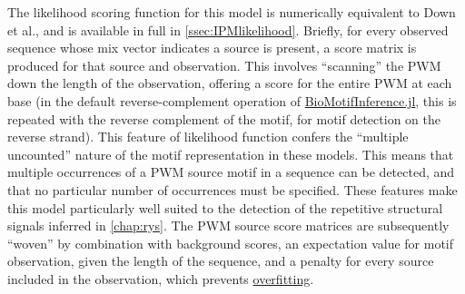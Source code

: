 \documentclass{ut-thesis}
\begin{document}
\begin{NoHyper}
The likelihood scoring function for this model is numerically equivalent to Down et al., and is available in full in \autoref{ssec:IPMlikelihood}. Briefly, for every observed sequence whose mix vector indicates a source is present, a score matrix is produced for that source and observation. This involves ``scanning'' the PWM down the length of the observation, offering a score for the entire PWM at each base (in the default reverse-complement operation of \hyperref[chap:BMI]{BioMotifInference.jl}, this is repeated with the reverse complement of the motif, for motif detection on the reverse strand). This feature of likelihood function confers the ``multiple uncounted'' nature of the motif representation in these models. This means that multiple occurrences of a PWM source motif in a sequence can be detected, and that no particular number of occurrences must be specified. These features make this model particularly well suited to the detection of the repetitive structural signals inferred in \autoref{chap:rys}. The PWM source score matrices are subsequently ``woven'' by combination with background scores, an expectation value for motif observation, given the length of the sequence, and a penalty for every source included in the observation, which prevents \hyperref[ssec:overfit]{overfitting}.


\end{NoHyper}
\end{document}
